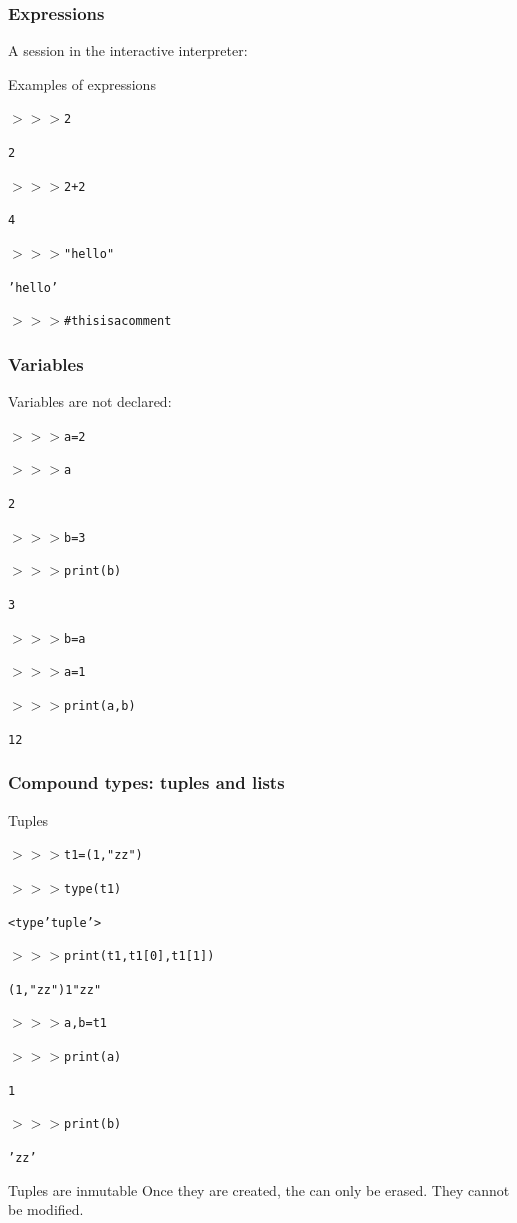 \documentclass[xcolor=pdftex,dvipsnames,table,mathserif]{beamer}
\begin{document}
\begin{frame}
  \frametitle{Expressions}

  A session in the interactive interpreter:
  \begin{block}{Examples of expressions}

    \begin{alltt}
      $>>>$ 2

      2

      $>>>$ 2+2

      4

      $>>>$ "hello"

      'hello'

      $>>>$ \# this is a comment
    \end{alltt}
  \end{block}
\end{frame}

\begin{frame}
  \frametitle{Variables}

    Variables are not declared:

    \begin{block}{}
    \begin{alltt}
      $>>>$ a = 2

      $>>>$ a

      2

      $>>>$ b = 3

      $>>>$ print(b)

      3

      $>>>$ b = a

      $>>>$ a = 1

      $>>>$ print(a,b)

      1 2
    \end{alltt}
  \end{block}
\end{frame}

\begin{frame}
  \frametitle{Compound types: tuples and lists}

  \begin{block}{Tuples}
    \begin{alltt}
      $>>>$ t1 = ( 1, "zz")

      $>>>$ type(t1)

      <type 'tuple'>

      $>>>$ print(t1, t1[0], t1[1])

      (1,"zz") 1 "zz"

      $>>>$ a,b = t1

      $>>>$ print(a)

      1

      $>>>$ print(b)

      'zz'
    \end{alltt}
  \end{block}

  \begin{alertblock}{Tuples are inmutable}
    Once they are created, the can only be erased. They cannot be modified.
  \end{alertblock}
\end{frame}
\end{document}
